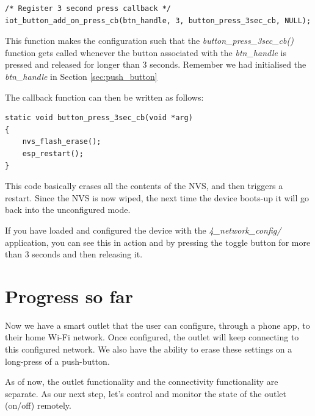 \documentclass[main.tex]{subfiles}
\begin{document}
\begin{verbatim}
/* Register 3 second press callback */
iot_button_add_on_press_cb(btn_handle, 3, button_press_3sec_cb, NULL);
\end{verbatim}

This function makes the configuration such that the \textit{button\_press\_3sec\_cb()} function gets called whenever the button associated with the \textit{btn\_handle} is pressed and released for longer than 3 seconds. Remember we had initialised the \textit{btn\_handle} in Section \ref{sec:push_button}

The callback function can then be written as follows:
\begin{verbatim}
static void button_press_3sec_cb(void *arg)
{
    nvs_flash_erase();
    esp_restart();
}
\end{verbatim}

This code basically erases all the contents of the NVS, and then triggers a restart. Since the NVS is now wiped, the next time the device boots-up it will go back into the unconfigured mode. 

If you have loaded and configured the device with the \textit{4\_network\_config/} application, you can see this in action and by pressing the toggle button for more than 3 seconds and then releasing it.

\section{Progress so far}
Now we have a smart outlet that the user can configure, through a phone app, to their home Wi-Fi network. Once configured, the outlet will keep connecting to this configured network. We also have the ability to erase these settings on a long-press of a push-button.

As of now, the outlet functionality and the connectivity functionality are separate. As our next step, let's control and monitor the state of the outlet (on/off) remotely.
\end{document}
